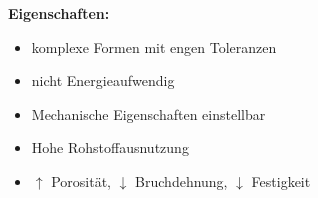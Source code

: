 \textbf{Eigenschaften:}
\begin{itemize}
    \item komplexe Formen mit engen Toleranzen
    \item nicht Energieaufwendig
    \item Mechanische Eigenschaften einstellbar
    \item Hohe Rohstoffausnutzung
    \item $\uparrow$ Porosität, $\downarrow$ Bruchdehnung, $\downarrow$ Festigkeit
\end{itemize}
